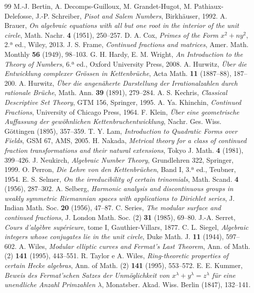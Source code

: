 \documentclass[11pt,a4paper]{article}
\theoremstyle{plain}
\theoremstyle{definition}
\theoremstyle{remark}
\begin{document}
\begin{thebibliography}{99}
 M.-J. Bertin, A. Decomps-Guilloux, M. Grandet-Hugot, M. Pathiaux-Delefosse,
J.-P. Schreiber, \emph{Pisot and Salem Numbers}, Birkhäuser, 1992.
 A. Brauer, \emph{On algebraic equations with all but one root in the interior
of the unit circle}, Math. Nachr. \textbf{4} (1951), 250--257.
 D. A. Cox, \emph{Primes of the Form $x^2+ny^2$}, 2.ª ed., Wiley, 2013.
 J. S. Frame, \emph{Continued fractions and matrices},
Amer. Math. Monthly \textbf{56} (1949), 98--103.
 G. H. Hardy, E. M. Wright, \emph{An Introduction to the Theory of Numbers},
6.ª ed., Oxford University Press, 2008.
 A. Hurwitz, \emph{Über die Entwicklung complexer Grössen in Kettenbrüche},
Acta Math. \textbf{11} (1887--88), 187--200.
 A. Hurwitz, \emph{Über die angenäherte Darstellung der Irrationalzahlen durch
rationale Brüche}, Math. Ann. \textbf{39} (1891), 279--284.
 A. S. Kechris, \emph{Classical Descriptive Set Theory}, GTM 156, Springer, 1995.
 A. Ya. Khinchin, \emph{Continued Fractions}, University of Chicago Press, 1964.
 F. Klein, \emph{Über eine geometrische Auffassung der gewöhnlichen
Kettenbruchentwicklung}, Nachr. Ges. Wiss. Göttingen (1895), 357--359.
 T. Y. Lam, \emph{Introduction to Quadratic Forms over Fields}, GSM 67, AMS, 2005.
 H. Nakada, \emph{Metrical theory for a class of continued fraction
transformations and their natural extensions}, Tokyo J. Math. \textbf{4} (1981), 399--426.
 J. Neukirch, \emph{Algebraic Number Theory}, Grundlehren 322, Springer, 1999.
 O. Perron, \emph{Die Lehre von den Kettenbrüchen}, Band I, 3.ª ed., Teubner, 1954.
 E. S. Selmer, \emph{On the irreducibility of certain trinomials},
Math. Scand. \textbf{4} (1956), 287--302.
 A. Selberg, \emph{Harmonic analysis and discontinuous groups in weakly
symmetric Riemannian spaces with applications to Dirichlet series},
J. Indian Math. Soc. \textbf{20} (1956), 47--87.
 C. Series, \emph{The modular surface and continued fractions},
J. London Math. Soc. (2) \textbf{31} (1985), 69--80.
 J.-A. Serret, \emph{Cours d'algèbre supérieure}, tome I, Gauthier-Villars, 1877.
 C. L. Siegel, \emph{Algebraic integers whose conjugates lie in the unit circle},
Duke Math. J. \textbf{11} (1944), 597--602.
 A. Wiles, \emph{Modular elliptic curves and Fermat's Last Theorem},
Ann. of Math. (2) \textbf{141} (1995), 443--551.
 R. Taylor e A. Wiles, \emph{Ring-theoretic properties of certain Hecke
algebras}, Ann. of Math. (2) \textbf{141} (1995), 553--572.
 E. E. Kummer, \emph{Beweis des Fermat'schen Satzes der Unmöglichkeit von
$x^\lambda+y^\lambda=z^\lambda$ für eine unendliche Anzahl Primzahlen $\lambda$},
Monatsber. Akad. Wiss. Berlin (1847), 132--141.
\end{thebibliography}
\end{document}
